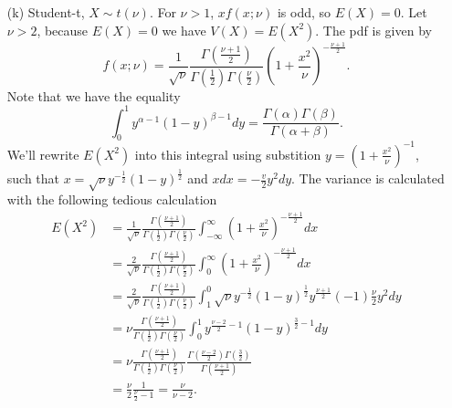 \begin{itemize}
\item[(k)] Student-t, $X \sim t(\nu)$.
For $\nu > 1$, $xf(x;\nu)$ is odd, so $E(X) = 0$.
Let $\nu > 2$, because $E(X) = 0$ we have $V(X) = E(X^2)$.
The pdf is given by
\begin{equation*}
    f(x; \nu) = \frac{1}{\sqrt{\nu}} \frac{\Gamma(\frac{\nu + 1}{2})}{\Gamma(\frac{1}{2}) \Gamma(\frac{\nu}{2})} \left(1 + \frac{x^2}{\nu}\right)^{-\frac{\nu + 1}{2}}.
\end{equation*}
Note that we have the equality
\begin{equation*}
    \int_0^1 y^{\alpha - 1} (1 - y)^{\beta - 1} dy = \frac{\Gamma(\alpha) \Gamma(\beta)}{\Gamma(\alpha + \beta)}.
\end{equation*}
We'll rewrite $E(X^2)$ into this integral using substition $y = \left(1 + \frac{x^2}{\nu}\right)^{-1}$, such that $x = \sqrt{\nu} y^{-\frac{1}{2}} (1 - y)^{\frac{1}{2}}$ and $x dx = -\frac{v}{2} y^2 dy$.
The variance is calculated with the following tedious calculation
\begin{equation*}
    \begin{split}
        E(X^2) &= \frac{1}{\sqrt{\nu}} \frac{\Gamma(\frac{\nu + 1}{2})}{\Gamma(\frac{1}{2}) \Gamma(\frac{\nu}{2})} \int_{-\infty}^{\infty} \left(1 + \frac{x^2}{\nu}\right)^{-\frac{\nu + 1}{2}} dx \\
            &= \frac{2}{\sqrt{\nu}} \frac{\Gamma(\frac{\nu + 1}{2})}{\Gamma(\frac{1}{2}) \Gamma(\frac{\nu}{2})} \int_{0}^{\infty} \left(1 + \frac{x^2}{\nu}\right)^{-\frac{\nu + 1}{2}} dx \\
            &= \frac{2}{\sqrt{\nu}} \frac{\Gamma(\frac{\nu + 1}{2})}{\Gamma(\frac{1}{2}) \Gamma(\frac{\nu}{2})} \int_{1}^{0} \sqrt{\nu} y^{-\frac{1}{2}} (1 - y)^{\frac{1}{2}} y^{\frac{\nu + 1}{2}} (-1) \frac{\nu}{2} y^2 dy \\
            &= \nu \frac{\Gamma(\frac{\nu + 1}{2})}{\Gamma(\frac{1}{2}) \Gamma(\frac{\nu}{2})} \int_{0}^{1} y^{\frac{\nu - 2}{2} - 1} (1 - y)^{\frac{3}{2} - 1} dy \\
            &= \nu \frac{\Gamma(\frac{\nu + 1}{2})}{\Gamma(\frac{1}{2}) \Gamma(\frac{\nu}{2})} \frac{\Gamma(\frac{\nu - 2}{2}) \Gamma(\frac{3}{2})}{\Gamma(\frac{\nu + 1}{2})} \\
            &= \frac{\nu}{2} \frac{1}{\frac{\nu}{2} - 1}
            = \frac{\nu}{\nu - 2}.
    \end{split}
\end{equation*}


\end{itemize}
